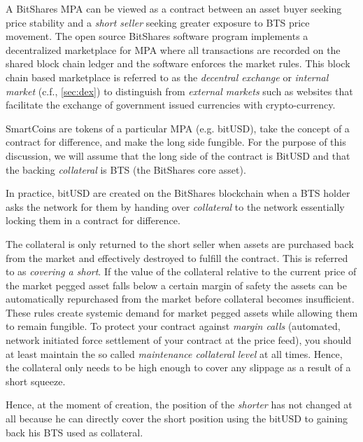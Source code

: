 A BitShares MPA can be viewed as a contract between an asset buyer seeking
price stability and a \emph{short seller} seeking greater exposure to BTS price
movement. The open source BitShares software program implements a decentralized
marketplace for MPA where all transactions are recorded on the shared block
chain ledger and the software enforces the market rules. This block chain based
marketplace is referred to as the \emph{decentral exchange} or \emph{internal
market} (c.f., \cref{sec:dex}) to distinguish from \emph{external markets} such
as websites that facilitate the exchange of government issued currencies with
crypto-currency. 

SmartCoins are tokens of a particular MPA (e.g. bitUSD), take the concept of a
contract for difference, and make the long side fungible. For the purpose of
this discussion, we will assume that the long side of the contract is BitUSD
and that the backing \emph{collateral} is BTS (the BitShares core asset).

In practice, bitUSD are created on the BitShares blockchain when a BTS holder
asks the network for them by handing over \emph{collateral} to the network
essentially locking them in a contract for difference.

The collateral is only returned to the short seller when assets are purchased
back from the market and effectively destroyed to fulfill the contract. This is
referred to as \emph{covering a short}. If the value of the collateral relative
to the current price of the market pegged asset falls below a certain margin of
safety the assets can be automatically repurchased from the market before
collateral becomes insufficient. These rules create systemic demand for market
pegged assets while allowing them to remain fungible. To protect your contract
against \emph{margin calls} (automated, network initiated force settlement of
your contract at the price feed), you should at least maintain the so called
\emph{maintenance collateral level} at all times. Hence, the collateral only
needs to be high enough to cover any slippage as a result of a short squeeze.

Hence, at the moment of creation, the position of the \emph{shorter} has not
changed at all because he can directly cover the short position using the
bitUSD to gaining back his BTS used as collateral.

